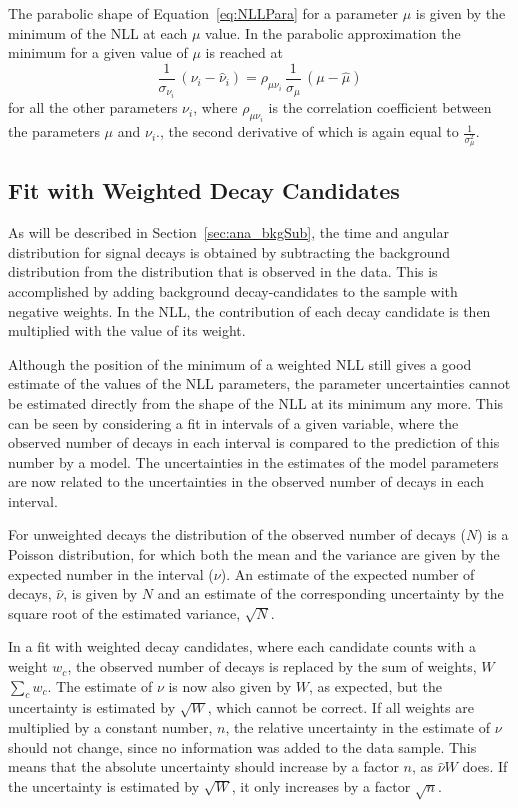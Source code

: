 The parabolic shape of Equation~\ref{eq:NLLPara} for a parameter $\mu$ is given by the minimum of the NLL at each $\mu$ value. In the
parabolic approximation the minimum for a given value of $\mu$ is reached at
\begin{equation}
  \frac{1}{\sigma_{\nu_i}}\, (\nu_i-\hat{\nu}_i)  = \rho_{\mu\nu_i}\, \frac{1}{\sigma_\mu}\, (\mu-\hat{\mu})
\end{equation}
for all the other parameters $\nu_i$, where $\rho_{\mu\nu_i}$ is the correlation coefficient between the parameters $\mu$ and $\nu_i$., the second derivative of which is again equal to
$\frac{1}{\sigma_\mu^2}$.


\subsection{Fit with Weighted Decay Candidates}
\label{subsec:ana_fit_weights}

As will be described in Section~\ref{sec:ana_bkgSub}, the time and angular distribution for \BstoJpsiKK{} signal decays is obtained by
subtracting the background distribution from the distribution that is observed in the data. This is accomplished by adding background
decay-candidates to the sample with negative weights. In the NLL, the contribution of each decay candidate is then multiplied with the
value of its weight.

Although the position of the minimum of a weighted NLL still gives a good estimate of the values of the NLL parameters, the parameter
uncertainties cannot be estimated directly from the shape of the NLL at its minimum any more. This can be seen by considering a fit in
intervals of a given variable, where the observed number of decays in each interval is compared to the prediction of this number by a
model. The uncertainties in the estimates of the model parameters are now related to the uncertainties in the observed number of decays in
each interval.

For unweighted decays the distribution of the observed number of decays ($N$) is a Poisson distribution, for which both the mean and the
variance are given by the expected number in the interval ($\nu$). An estimate of the expected number of decays, $\hat{\nu}$, is given by
$N$ and an estimate of the corresponding uncertainty by the square root of the estimated variance, $\sqrt{N}$.

In a fit with weighted decay candidates, where each candidate counts with a weight $w_c$, the observed number of decays is replaced by the
sum of weights, $W$\textequiv$\sum_c w_c$. The estimate of $\nu$ is now also given by $W$, as expected, but the uncertainty is estimated by
$\sqrt{W}$, which cannot be correct. If all weights are multiplied by a constant number, $n$, the relative uncertainty in the estimate of
$\nu$ should not change, since no information was added to the data sample. This means that the absolute uncertainty should increase by a
factor $n$, as $\hat{\nu}$\texteq$W$ does. If the uncertainty is estimated by $\sqrt{W}$, it only increases by a factor $\sqrt{n}$.

